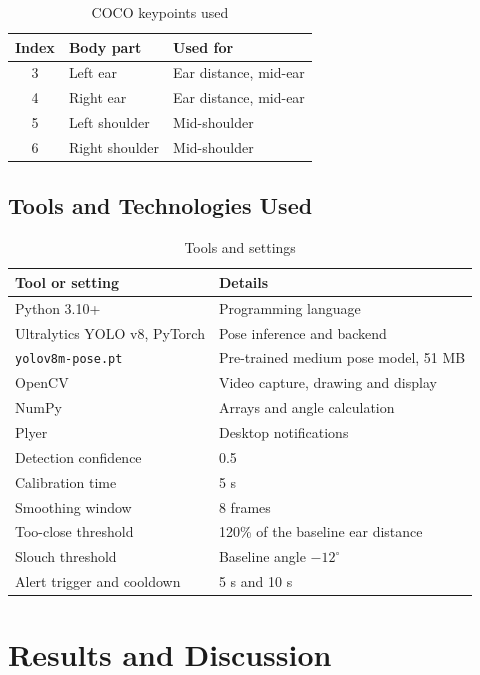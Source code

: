 ﻿\documentclass[12pt,a4paper]{article}
\begin{document}
\begin{table}[htpb]
\centering
\caption{COCO keypoints used}\label{tab:kp}
\renewcommand{\arraystretch}{1.2}
\begin{tabular}{@{}cll@{}}
\toprule
\textbf{Index} & \textbf{Body part} & \textbf{Used for}\\
\midrule
3 & Left ear & Ear distance, mid-ear\\
4 & Right ear & Ear distance, mid-ear\\
5 & Left shoulder & Mid-shoulder\\
6 & Right shoulder & Mid-shoulder\\
\bottomrule
\end{tabular}
\end{table}

\subsection{Tools and Technologies Used}
\begin{table}[htpb]
\centering
\caption{Tools and settings}\label{tab:tools}
\renewcommand{\arraystretch}{1.25}
\begin{tabularx}{\textwidth}{@{}>{\raggedright\arraybackslash}p{5cm}Y@{}}
\toprule
\textbf{Tool or setting} & \textbf{Details}\\
\midrule
Python 3.10+ & Programming language\\
Ultralytics YOLO v8, PyTorch & Pose inference and backend \cite{ultralytics,pytorch}\\
\texttt{yolov8m-pose.pt} & Pre-trained medium pose model, 51 MB\\
OpenCV & Video capture, drawing and display \cite{opencv}\\
NumPy & Arrays and angle calculation\\
Plyer & Desktop notifications \cite{plyer}\\
Detection confidence & 0.5\\
Calibration time & 5 s\\
Smoothing window & 8 frames\\
Too-close threshold & 120\% of the baseline ear distance\\
Slouch threshold & Baseline angle $-12^\circ$\\
Alert trigger and cooldown & 5 s and 10 s\\
\bottomrule
\end{tabularx}
\end{table}

\clearpage
\section{Results and Discussion}
\end{document}
